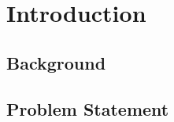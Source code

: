 \chapter{Introduction}
\label{ch:intro}

\lipsum[1-3] \cite{chi_fast_2020} \cite{chi_fast_2020, cooper2019iof, djoumessi_hybrid_2025, hussain_computer-aided_2019, pant_singh_nodate}
 
\section{Background}
\lipsum[1-3] %

\section{Problem Statement}
\lipsum[1-3]